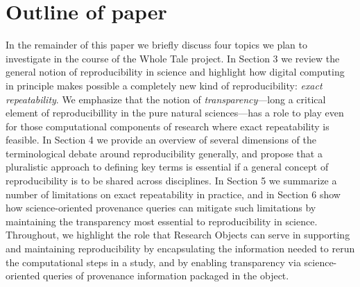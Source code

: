\section{Outline of paper}
In the remainder of this paper we briefly discuss four topics we plan to investigate
	in the course of the Whole Tale project.
In Section 3 we review the general notion of reproducibility in science and highlight how 
	digital computing in principle makes possible a completely new kind of reproducibility: 
	\emph{exact repeatability}. 
We emphasize that the notion of \emph{transparency}---long a critical element of
	reproducibillity in the pure natural sciences---has a role to play even for those computational components
	of research where exact repeatability is feasible.
In Section 4 we provide an overview of several dimensions of the terminological debate around reproducibility
	generally, and propose that a pluralistic approach to defining key terms is essential if a general 
	concept of reproducibility is to be shared across disciplines.
In Section 5 we summarize a number of limitations on exact repeatability in practice, and in Section 6 
	show how science-oriented provenance queries can mitigate such limitations by maintaining
 	the transparency most essential to reproducibility in science.
Throughout, we highlight the role that Research Objects can serve in supporting and maintaining 
	reproducibility by encapsulating the information needed to rerun the computational steps
	in a study, and by enabling transparency via science-oriented queries of provenance information
	packaged in the object. 
 